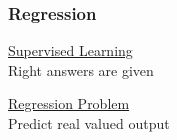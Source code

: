 \documentclass[xcolor=pdftex,dvipsnames]{beamer}
\begin{document}
\begin{frame}
  \frametitle{Regression}
  \vspace{-0.2cm}
  \begin{center}
  \end{center}
  \pause \pause
  \begin{minipage}{0.47\linewidth}
    \begin{block}{}
      \underline{Supervised Learning}\\ \vspace{0.2cm}
      \alert{Right answers} are given
     \end{block}
   \end{minipage}\hfill
  \pause
  \begin{minipage}{0.47\linewidth}
    \begin{block}{}
      \underline{Regression Problem}\\ \vspace{0.2cm}
      Predict \alert{real valued} output
    \end{block}
  \end{minipage}
\end{frame}
\end{document}
